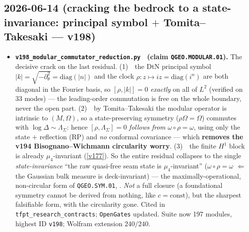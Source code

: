 \subsection*{2026-06-14 (cracking the bedrock to a state-invariance: principal symbol $+$ Tomita--Takesaki --- v198)}
\begin{itemize}
\item \textbf{\texttt{v198\_modular\_commutator\_reduction.py} \mO\ (claim \texttt{QGEO.MODULAR.01}).} The
  decisive crack on the last residual. (1)~\mE\ the DtN principal symbol
  $|k|=\sqrt{-\partial_\theta^2}=\mathrm{diag}(|n|)$ and the clock $\rho{:}z\mapsto iz=\mathrm{diag}(i^n)$ are
  both diagonal in the Fourier basis, so $[\rho,|k|]=0$ \emph{exactly} on all of $L^2$ (verified on 33
  modes) --- the leading-order commutation is free on the whole boundary, never the open part. (2)~\mE\ by
  Tomita--Takesaki the modular operator is intrinsic to $(M,\Omega)$, so a state-preserving symmetry
  ($\rho\Omega=\Omega$) commutes with $\log\Delta\sim\Lambda_\Sigma$: hence $[\rho,\Lambda_\Sigma]=0$
  \emph{follows from} $\omega\circ\rho=\omega$, using only the state $+$ reflection (RP) and \emph{no}
  conformal covariance --- which \textbf{removes the v194 Bisognano--Wichmann circularity worry}. (3)~\mE\
  the finite $H^1$ block is already $\mu_4$-invariant (\vref{v177}). So the entire residual collapses to the
  single \emph{state-invariance} ``the raw quasi-free seam state is $\mu_4$-invariant''
  ($\omega\circ\rho=\omega$ $\Leftarrow$ the Gaussian bulk measure is deck-invariant) --- the
  maximally-operational, non-circular form of \texttt{QGEO.SYM.01}, \mO. \emph{Not} a full closure (a
  foundational symmetry cannot be derived from nothing, like $c=\text{const}$), but the sharpest falsifiable
  form, with the circularity gone. Cited in \texttt{tfpt\_research\_contracts}; \texttt{OpenGates} updated.
  Suite now 197 modules, highest ID \texttt{v198}; Wolfram extension $240/240$.
\end{itemize}

